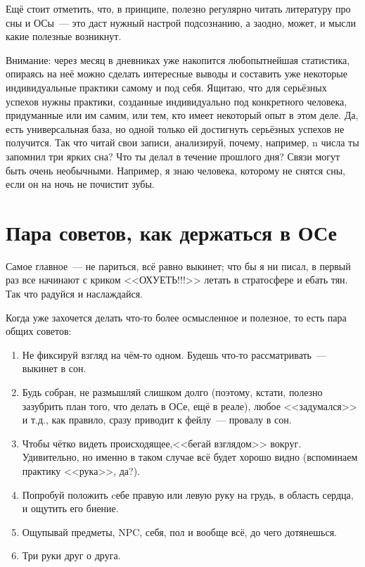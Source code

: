 \documentclass[a4paper,14pt,oneside]{memoir}
\begin{document}
Ещё стоит отметить, что, в принципе, полезно регулярно читать литературу про сны и ОСы~--- это даст нужный настрой подсознанию, а заодно, может, и мысли какие полезные возникнут.

Внимание: через месяц в дневниках уже накопится любопытнейшая статистика, опираясь на неё можно сделать интересные выводы и составить уже некоторые индивидуальные практики самому и под себя. Ящитаю, что для серьёзных успехов нужны практики, созданные индивидуально под конкретного человека, придуманные или им самим, или тем, кто имеет некоторый опыт в этом деле. Да, есть универсальная база, но одной только ей достигнуть серьёзных успехов не получится. Так что читай свои записи, анализируй, почему, например, n числа ты запомнил три ярких сна? Что ты делал в течение прошлого дня? Связи могут быть очень необычными. Например, я знаю человека, которому не снятся сны, если он на ночь не почистит зубы. 

\section{Пара советов, как держаться в ОСе}

Самое главное~--- не париться, всё равно выкинет; что бы я ни писал, в первый раз все начинают с криком <<ОХУЕТЬ!!!>> летать в стратосфере и ебать тян. Так что радуйся и наслаждайся.

Когда уже захочется делать что-то более осмысленное и полезное, то есть пара общих советов:
\begin{enumerate}
\item Не фиксируй взгляд на чём-то одном. Будешь что-то рассматривать~--- выкинет в сон.
\item Будь собран, не размышляй слишком долго (поэтому, кстати, полезно зазубрить план того, что делать в ОСе, ещё в реале), любое <<задумался>> и т.д., как правило, сразу приводит к фейлу~--- провалу в сон.
\item Чтобы чётко видеть происходящее,<<бегай взглядом>> вокруг. Удивительно, но именно в таком случае всё будет хорошо видно (вспоминаем практику <<рука>>, да?).
\item Попробуй положить cебе правую или левую руку на грудь, в область сердца, и ощутить его биение.
\item Ощупывай предметы, NPC, себя, пол и вообще всё, до чего дотянешься.
\item Три руки друг о друга.
\end{enumerate}   
\end{document}
